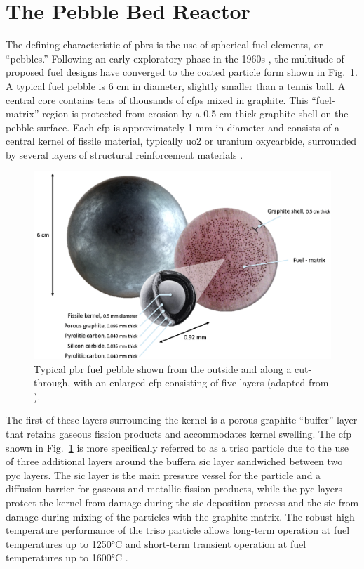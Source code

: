 \section{The Pebble Bed Reactor}
\label{sec:pbr_concept}

The defining characteristic of \glspl{pbr} is the use of spherical fuel elements, or ``pebbles.'' Following an early exploratory phase in the 1960s \cite{claxton,hecker}, the multitude of proposed fuel designs have converged to the coated particle form shown in Fig.\ \ref{fig:pbr_fuel}. A typical fuel pebble is 6 \si{\centi\meter} in diameter, slightly smaller than a tennis ball. A central core contains tens of thousands of \glspl{cfp} mixed in graphite. This ``fuel-matrix'' region is protected from erosion by a 0.5 \si{\centi\meter} thick graphite shell on the pebble surface. Each \gls{cfp} is approximately 1 \si{\milli\meter} in diameter and consists of a central kernel of fissile material, typically \gls{uo2} or uranium oxycarbide, surrounded by several layers of structural reinforcement materials \cite{demkowicz, powers}.

\begin{figure}[!h]
\centering
\includegraphics[width=0.6\linewidth]{figs/pbr_fuel.png}
\caption{Typical \gls{pbr} fuel pebble shown from the outside and along a cut-through, with an enlarged \gls{cfp} consisting of five layers (adapted from \cite{x_energy_pebble}).}
\label{fig:pbr_fuel}
\end{figure}

The first of these layers surrounding the kernel is a porous graphite ``buffer'' layer that retains gaseous fission products and accommodates kernel swelling. The \gls{cfp} shown in Fig.\ \ref{fig:pbr_fuel} is more specifically referred to as a \gls{triso} particle due to the use of three additional layers around the buffer\mdash a \gls{sic} layer sandwiched between two \gls{pyc} layers. The \gls{sic} layer is the main pressure vessel for the particle and a diffusion barrier for gaseous and metallic fission products, while the \gls{pyc} layers protect the kernel from damage during the \gls{sic} deposition process and the \gls{sic} from damage during mixing of the particles with the graphite matrix. The robust high-temperature performance of the \gls{triso} particle allows long-term operation at fuel temperatures up to 1250\si{\celsius} and short-term transient operation at fuel temperatures up to 1600\si{\celsius} \cite{nabielek,demkowicz}.

